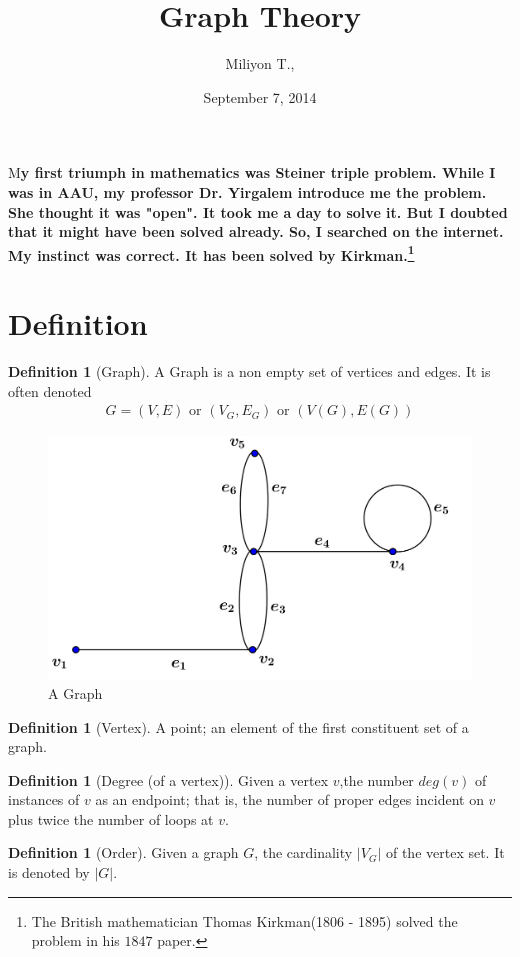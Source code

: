 \documentclass[	DIV=calc,paper=a4,fontsize=11pt]{scrartcl}	 					%
\title{Graph Theory}					%
\author{Miliyon T., }											%
\date{September 7, 2014}																				%
\theoremstyle{definition}
\newtheorem{defn}[thm]{Definition}
\theoremstyle{plain}
\theoremstyle{remark}
\newcommand{\initial}[1]{%
     \lettrine[lines=3,lhang=0.3,nindent=0em]{
     				\color{DarkGoldenrod}
     				{\textsf{#1}}}{}}
\begin{document}
\maketitle
\thispagestyle{fancy} 			%
\initial{M}\textbf{y first triumph in mathematics was Steiner triple problem. While I was in AAU, my professor Dr. Yirgalem introduce me the problem. She thought it was "open". It took me a day to solve it. But I doubted that it might have been solved already. So, I searched on the internet. My instinct was correct. It has been solved by Kirkman.\footnote{The British mathematician Thomas Kirkman(1806 - 1895) solved the problem in his $1847$ paper.}}

\section{Definition}
\begin{defn}[Graph] A Graph is a non empty set of vertices and edges. It is often denoted
\begin{align*}
G=(V,E) \text{ or } (V_G,E_G) \text{ or } (V(G),E(G))
\end{align*}
\end{defn}

\begin{figure}[hbt!]
\centering
\includegraphics[width=.4\textwidth]{graph.png}
\caption{A Graph}\label{fig1}
\end{figure}

\begin{defn}[Vertex]
A point; an element of the first constituent set of a graph.
\end{defn}
\begin{defn}[Degree (of a vertex)]
Given a vertex $v$,the number $deg(v)$ of instances of $v$ as an endpoint; that is, the number of proper edges incident on $v$ plus twice the number of loops at $v$.
\end{defn}

\begin{defn}[Order]
Given a graph $G$, the cardinality $|V_G|$ of the vertex set. It is denoted by $|G|$.
\end{defn}
\end{document}
